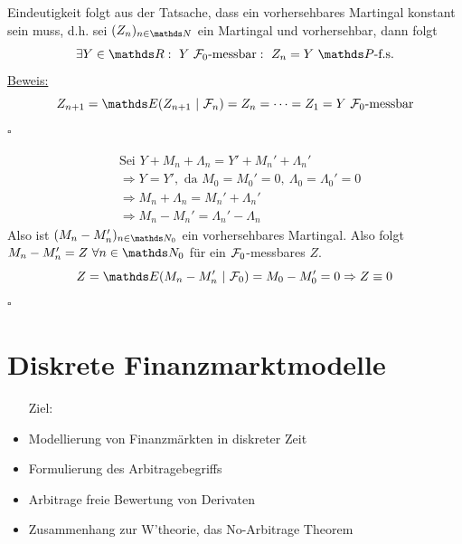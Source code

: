 Eindeutigkeit folgt aus der Tatsache, dass ein vorhersehbares Martingal konstant sein muss, d.h. sei $(Z_n)_{n\in\N}$ ein Martingal und vorhersehbar, dann folgt 
\[
\exists Y\in\R:~Y~ \F_0\text{-messbar}:~Z_n=Y~\Pw\text{-f.s.}
\]
\uline{Beweis:} 
\[
Z_{n+1}=\E(Z_{n+1}~|~\F_n)=Z_n=\dots=Z_1=Y ~ \F_0\text{-messbar} 
\] 
\hfill $\square$

\begin{equation*}
\begin{aligned}
	&\text{Sei } Y+M_n+\Lambda_n=Y'+M_n'+\Lambda_n'\\
	&\Rightarrow Y=Y', \text{ da } M_0=M_0'=0,~ \Lambda_0=\Lambda_0'=0\\
	&\Rightarrow M_n+\Lambda_n=M_n'+\Lambda_n'\\
	&\Rightarrow M_n-M_n'=\Lambda_n'-\Lambda_n
\end{aligned}
\end{equation*}
Also ist $(M_n-M_n')_{n\in \N_0}$ ein vorhersehbares Martingal. Also folgt $M_n-M_n'=Z~\forall n\in \N_0$ für ein $\mathcal{F}_0$-messbares $Z$.
\[
Z=\E(M_n-M_n'~|~\F_0)=M_0-M_0'=0 \Rightarrow Z\equiv 0 
\]
\hfill $\square$


\section{Diskrete Finanzmarktmodelle}
\label{sec:disk_finanzmarktmodelle}
\begin{itemize}
	\item[Ziel:]
	\item Modellierung von Finanzmärkten in diskreter Zeit
	\item Formulierung des Arbitragebegriffs
	\item Arbitrage freie Bewertung von Derivaten
	\item Zusammenhang zur W'theorie, das No-Arbitrage Theorem
\end{itemize}

